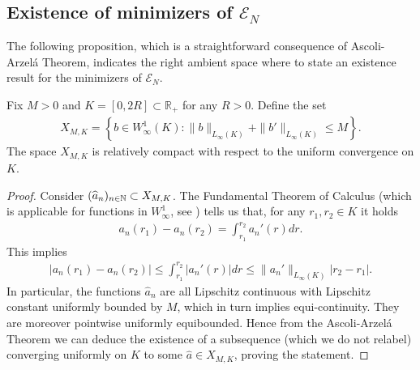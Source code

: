 \subsection{Existence of minimizers of $\mathcal E_N$}
The following proposition, which is a straightforward consequence of Ascoli-Arzel\'a Theorem, indicates the right ambient space where to state an existence result for the minimizers of $\mathcal E_N$.

\begin{proposition}\label{XMdef}
Fix $M > 0$ and $K=[0,2R] \subset  \mathbb R_+$ for any $R>0$. Define the set
\begin{align*}
X_{M,K} = \left\{b \in W^{1}_{\infty}(K) :
 \|b\|_{L_{\infty}(K)} + \|b'\|_{L_{\infty}(K)} \leq M
 \right\}.
\end{align*}
The space $X_{M,K}$ is relatively compact with respect to the uniform convergence on $K$.
\end{proposition}
\begin{proof}
Consider $(\widehat a_n)_{n \in \mathbb{N}} \subset X_{M,K}$. The Fundamental Theorem of Calculus (which is applicable for functions in $W^{1}_{\infty}$, see \cite[Theorem 2.8]{AFP00}) tells us that, for any $r_1,r_2 \in K$ it holds
	\begin{align*}
		a_n(r_1)-a_n(r_2)=\int_{r_1}^{r_2}a_n'(r)dr.
	\end{align*}
	This implies
	\begin{align*}
		\bigl|a_n(r_1)-a_n(r_2)\bigr|\leq\int_{r_1}^{r_2}|a_n'(r)|dr
			\leq \|a_n'\|_{L_\infty(K)}|r_2-r_1|.
	\end{align*}
	In particular, the functions $\widehat a_n$ are all Lipschitz continuous with Lipschitz constant uniformly bounded by
	$M$, which in turn implies equi-continuity. They are moreover pointwise uniformly equibounded.
Hence from the Ascoli-Arzel\'a Theorem we can deduce the existence of a subsequence (which we do not relabel) converging uniformly on $K$ to some $\widehat a \in X_{M,K}$, proving the statement.
\end{proof}

